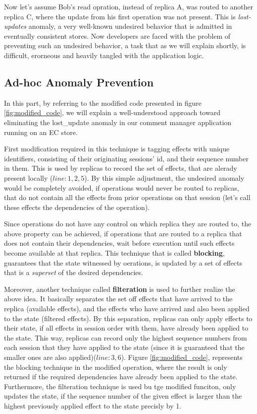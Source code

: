 Now let's assume Bob's read opration, instead of replica A, was routed
to another replica C, where the update from his first operation was not
present. This is \emph{lost-updates} anomaly, a very well-known
undesired behavior that is admitted in eventually consistent stores. 
Now developers are faced with the problem of preventing such an undesired
behavior, a task that as we will explain shortly, is difficult,
erorneous and heavily tangled with the application logic.
%
%
\subsection{Ad-hoc Anomaly Prevention}
In this part, by referring to the modified code  presented in figure
\ref{fig:modified_code}, we will
explain a well-understood approach toward eliminating the lost\_update anomaly in
our comment manager application running on an EC store.

First modification required in this technique is tagging effects with
unique identifiers, consisting of their originating sessions' id, and their
sequence number in them. This is used by replicas to
record the set of effects, that are alerady present locally
($line:1,2,5$). By this simple adjustment, the undesired anomaly would
be completely avoided, if operations would never be routed to replicas,
that do not contain all the effects from prior operations on that
session (let's call these effects the dependencies of
the operation). 

Since operations do not have any control on which replica they are
routed to, the above property can be achieved, if operations that are
routed to a replica that does not contain their dependencies, wait
before execution until such effects become available at that replica.
This technique that is called {\bf blocking}, guarantees that the state
witnessed by oerations, 
is updated by a set of effects that is a \emph{superset} of the desired
dependencies.

Moreover, another technique called {\bf filteration} is used to further realize
the above idea. It basically separates the set off effects that have
arrived to the replica (available effects), and the effects who have
arrived and also been applied to the state (filtered effects).
By this separation, replicas can only apply effects to their state, if all
effects in session order with them, have already been applied to the
state. 
This way, replicas can record only the highest sequence
numbers from each session that they have applied to the state (since it
is guaranteed that the smaller ones are also applied)($line:3,6$). 
Figure \ref{fig:modified_code}, represents the blocking technique in the modified \readC{}
operation, where the result is only returned if the required
dependencies have already been applied to the state. Furthermore, the
filteration technique is used bu tge modified \applyC{} funciton, only
updates the state, if the sequence number of the given effect is
larger than the highest previously applied effect to the state precisly
by 1.


